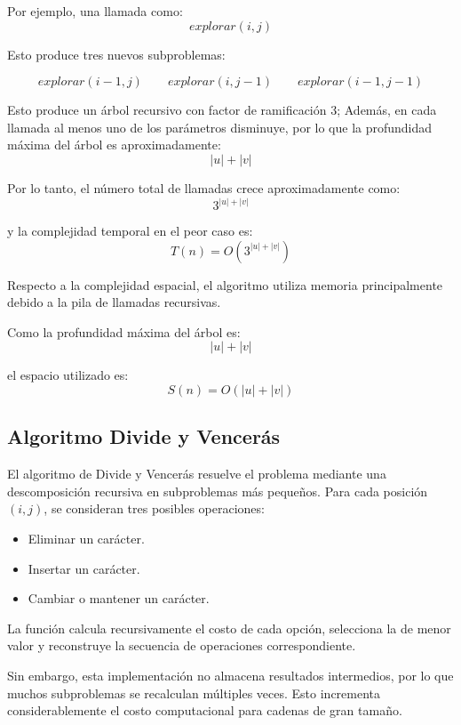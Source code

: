 \documentclass[12pt]{article}
\begin{document}
Por ejemplo, una llamada como:
$$explorar(i,j)$$

Esto produce tres nuevos subproblemas:

$$explorar(i-1,j) \qquad explorar(i,j-1) \qquad explorar(i-1,j-1)$$

Esto produce un árbol recursivo con factor de ramificación 3; Además, en cada llamada al menos uno de los parámetros disminuye, por lo que la profundidad máxima del árbol es aproximadamente:
$$|u| + |v|$$

Por lo tanto, el número total de llamadas crece aproximadamente como:
$$3^{|u|+|v|}$$

y la complejidad temporal en el peor caso es:
$$T(n)=O(3^{|u|+|v|})$$

Respecto a la complejidad espacial, el algoritmo utiliza memoria principalmente debido a la pila de llamadas recursivas.

Como la profundidad máxima del árbol es:
$$|u| + |v|$$

el espacio utilizado es:
$$S(n)=O(|u|+|v|)$$

\subsection*{Algoritmo Divide y Vencerás}

El algoritmo de Divide y Vencerás resuelve el problema mediante una descomposición recursiva en subproblemas más pequeños.
Para cada posición \((i,j)\), se consideran tres posibles operaciones:

\begin{itemize}
    \item Eliminar un carácter.
    \item Insertar un carácter.
    \item Cambiar o mantener un carácter.
\end{itemize}

La función calcula recursivamente el costo de cada opción, selecciona la de menor valor y reconstruye la secuencia de operaciones correspondiente.

Sin embargo, esta implementación no almacena resultados intermedios, por lo que muchos subproblemas se recalculan múltiples veces. Esto incrementa considerablemente el costo computacional para cadenas de gran tamaño.
\end{document}
